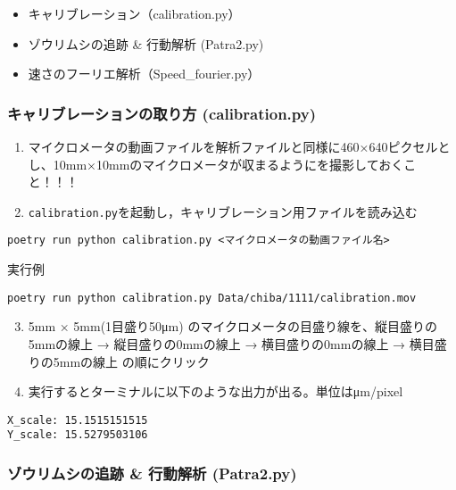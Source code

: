 \documentclass[]{jsarticle}
\newcommand{\passthrough}[1]{#1}
\providecommand{\tightlist}{%
   \setlength{\itemsep}{0pt}\setlength{\parskip}{0pt}}
\begin{document}
\begin{itemize}
\tightlist
\item
  キャリブレーション（calibration.py）
\item
  ゾウリムシの追跡 \& 行動解析 (Patra2.py)
\item
  速さのフーリエ解析（Speed\_fourier.py）
\end{itemize}

\hypertarget{ux30adux30e3ux30eaux30d6ux30ecux30fcux30b7ux30e7ux30f3ux306eux53d6ux308aux65b9-calibration.py}{%
\subsubsection{キャリブレーションの取り方
(calibration.py)}\label{ux30adux30e3ux30eaux30d6ux30ecux30fcux30b7ux30e7ux30f3ux306eux53d6ux308aux65b9-calibration.py}}

\begin{enumerate}
\tightlist
\item
  マイクロメータの動画ファイルを解析ファイルと同様に460×640ピクセルとし、10mm×10mmのマイクロメータが収まるようにを撮影しておくこと！！！
\item
  \passthrough{\lstinline!calibration.py!}を起動し，キャリブレーション用ファイルを読み込む
\end{enumerate}

\begin{lstlisting}
poetry run python calibration.py <マイクロメータの動画ファイル名>
\end{lstlisting}

実行例

\begin{lstlisting}
poetry run python calibration.py Data/chiba/1111/calibration.mov
\end{lstlisting}

\begin{enumerate}
\setcounter{enumi}{2}
\tightlist
\item
  5mm × 5mm(1目盛り50μm)
  のマイクロメータの目盛り線を、縦目盛りの5mmの線上 →
  縦目盛りの0mmの線上 → 横目盛りの0mmの線上 → 横目盛りの5mmの線上
  の順にクリック
\item
  実行するとターミナルに以下のような出力が出る。単位はμm/pixel
\end{enumerate}

\begin{lstlisting}
X_scale: 15.1515151515 
Y_scale: 15.5279503106 
\end{lstlisting}

\hypertarget{ux30beux30a6ux30eaux30e0ux30b7ux306eux8ffdux8de1-ux884cux52d5ux89e3ux6790-patra2.py}{%
\subsubsection{ゾウリムシの追跡 \& 行動解析
(Patra2.py)}\label{ux30beux30a6ux30eaux30e0ux30b7ux306eux8ffdux8de1-ux884cux52d5ux89e3ux6790-patra2.py}}
\end{document}

